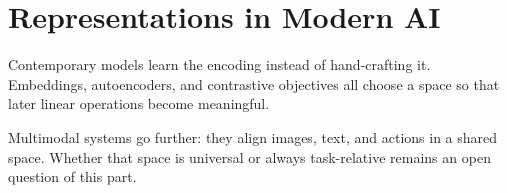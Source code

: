\chapter{Representations in Modern AI}
\label{ch:representations-in-ai}

Contemporary models learn the encoding instead of hand-crafting it. Embeddings, autoencoders, and contrastive objectives all choose a space so that later linear operations become meaningful.

Multimodal systems go further: they align images, text, and actions in a shared space. Whether that space is universal or always task-relative remains an open question of this part.
